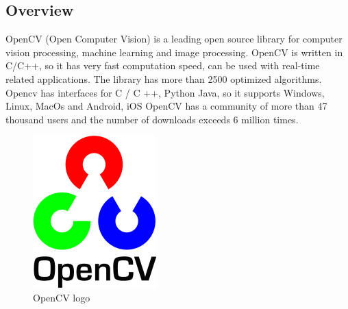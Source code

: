     \subsection{Overview}
        OpenCV (Open Computer Vision) is a leading open source library for computer vision processing, machine learning and image processing. OpenCV is written in C/C++, so it has very fast computation speed, can be used with real-time related applications. 
        The library has more than 2500 optimized algorithms. \\
        \vspace{3mm}
        Opencv has interfaces for C / C ++, Python Java, so it supports Windows, Linux, MacOs and Android, iOS OpenCV has a community of more than 47 thousand users and the number of downloads exceeds 6 million times.
        \begin{figure}[H]
            \centering
            \includegraphics[width=0.6\linewidth]{img/opencv.png}
            \caption{OpenCV logo}
        \end{figure}
